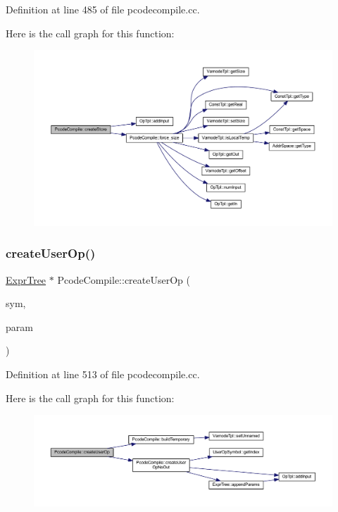 Definition at line 485 of file pcodecompile.\+cc.

Here is the call graph for this function\+:
\nopagebreak
\begin{figure}[H]
\begin{center}
\leavevmode
\includegraphics[width=350pt]{class_pcode_compile_a4a695c299bec6d0142fa28c988dadb5f_cgraph}
\end{center}
\end{figure}
\mbox{\label{class_pcode_compile_a7eff95e3fafefc24d8b6891dc272751a}} 
\subsubsection{\texorpdfstring{createUserOp()}{createUserOp()}}
{\footnotesize\ttfamily \mbox{\hyperlink{class_expr_tree}{Expr\+Tree}} $\ast$ Pcode\+Compile\+::create\+User\+Op (\begin{DoxyParamCaption}\item[{\mbox{\hyperlink{class_user_op_symbol}{User\+Op\+Symbol}} $\ast$}]{sym,  }\item[{vector$<$ \mbox{\hyperlink{class_expr_tree}{Expr\+Tree}} $\ast$ $>$ $\ast$}]{param }\end{DoxyParamCaption})}



Definition at line 513 of file pcodecompile.\+cc.

Here is the call graph for this function\+:
\nopagebreak
\begin{figure}[H]
\begin{center}
\leavevmode
\includegraphics[width=350pt]{class_pcode_compile_a7eff95e3fafefc24d8b6891dc272751a_cgraph}
\end{center}
\end{figure}
\mbox{\label{class_pcode_compile_ac76e5f48d5549b256163fa382b979462}} 
